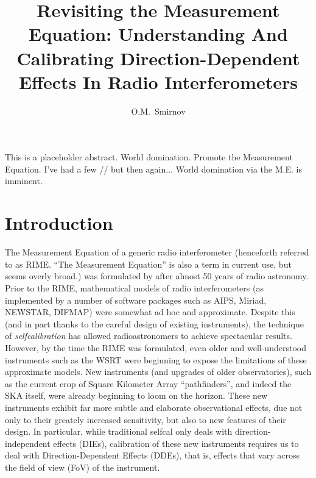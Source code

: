 \documentclass[]{aa}
\begin{document}
\title{Revisiting the Measurement Equation: Understanding And Calibrating Direction-Dependent Effects  In Radio Interferometers}

\author{O.M.\ Smirnov}


\date{}


\abstract%
{This is a placeholder abstract.}%
{World domination.}
{Promote the Measurement Equation.}%
{I've had a few // but then again...}%
{World domination via the M.E. is imminent.}


\maketitle

\section*{Introduction}

The Measurement Equation of a generic radio interferometer (henceforth referred to as RIME. ``The Measurement Equation'' is also a term in current use, but seems overly broad.) was formulated by \citet{ME1} after almost 50 years of radio astronomy. Prior to the RIME, mathematical models of radio interferometers (as implemented by a number of software packages such as AIPS, Miriad, NEWSTAR, DIFMAP) were somewhat ad hoc and approximate. Despite this (and in part thanks to the careful design of existing instruments), the technique of {\em selfcalibration} \citep{Cornwell:selfcal} has allowed radioastronomers to achieve spectacular results. However, by the time the RIME was formulated, even older and well-understood instruments such as the WSRT were beginning to expose the limitations of these approximate models. New instruments (and upgrades of older observatories), such as the current crop of Square Kilometer Array \citep{Schilizzi:SKA} ``pathfinders'', and indeed the SKA itself, were already beginning to loom on the horizon. These new instruments exhibit far more subtle and elaborate observational effects, due not only to their greately increased sensitivity, but also to new features of their design. In particular, while traditional selfcal only deals with direction-independent effects (DIEs), calibration of these new instruments requires us to deal with Direction-Dependent Effects (DDEs), that is, effects that vary across the field of view (FoV) of the instrument. 
\end{document}
